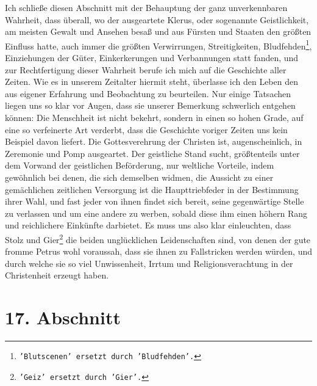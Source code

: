 Ich schließe diesen Abschnitt mit der Behauptung der ganz unverkennbaren
Wahrheit, dass überall, wo der ausgeartete
Klerus, oder sogenannte
Geistlichkeit, am meisten
Gewalt und Ansehen besaß und aus Fürsten und
Staaten den größten Einfluss hatte, auch immer die größten Verwirrungen,
Streitigkeiten, Bludfehden\footnote{\texttt{'Blutscenen' ersetzt durch
'Bludfehden'.}}, Einziehungen der Güter, Einkerkerungen und
Verbannungen statt fanden, und zur Rechtfertigung dieser
Wahrheit berufe ich
mich auf die Geschichte aller Zeiten. Wie es in unserem Zeitalter hiermit steht,
überlasse ich den Leben den aus eigener Erfahrung und Beobachtung zu
beurteilen. Nur einige Tatsachen liegen uns so klar vor Augen, dass sie unserer
Bemerkung schwerlich entgehen können: Die Menschheit ist nicht
bekehrt, sondern
in einen so hohen Grade, auf eine so verfeinerte Art verderbt, dass die
Geschichte voriger Zeiten uns kein Beispiel davon liefert. Die Gottesverehrung
der Christen ist, augenscheinlich, in Zeremonie und Pomp ausgeartet. Der
geistliche Stand sucht, größtenteils unter dem Vorwand der geistlichen
Beförderung, nur weltliche Vorteile, indem gewöhnlich bei denen, die sich
demselben widmen, die Aussicht zu einer gemächlichen zeitlichen Versorgung ist
die
Haupttriebfeder in der Bestimmung ihrer Wahl, und fast jeder von ihnen findet
sich
bereit, seine gegenwärtige Stelle zu verlassen und um eine andere zu
werben, sobald diese ihm einen höhern Rang und reichlichere Einkünfte darbietet.
Es muss uns also klar einleuchten, dass Stolz und Gier\footnote{\texttt{'Geiz'
ersetzt durch 'Gier'.}} die beiden unglücklichen
Leidenschaften sind, von denen der gute fromme Petrus
wohl voraussah, dass sie
ihnen zu Fallstricken werden würden, und durch welche sie so viel Unwissenheit,
Irrtum und Religionsverachtung in der Christenheit erzeugt haben.

\section{17. Abschnitt} \label{kap7_ab17}

